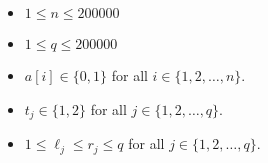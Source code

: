 \begin{itemize}
\tightlist
\item $1\le n \le 200000$
\item $1\le q \le 200000$
\item $a[i]\in\{0,1\}$ for all $i\in \{1,2,\dots,n\}$.
\item $t_j\in\{1,2\}$ for all $j\in \{1,2,\dots,q\}$.
\item $1\le \ell_j \le r_j \le q$ for all $j\in \{1,2,\dots,q\}$.
\end{itemize}
